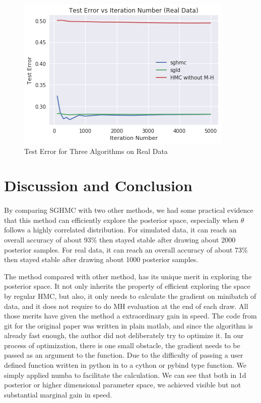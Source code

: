 \documentclass[11pt]{article}
\begin{document}
\begin{figure}[h!]
\centering
\caption{Test Error for Three Algorithms on Real Data}
\label{fig:Figure2}
\includegraphics[scale=0.5]{real.png}
\end{figure}




\section{Discussion and Conclusion}
\paragraph{}
By comparing SGHMC with two other methods, we had some practical evidence that this method can efficiently explore the posterior space, especially when $\theta$ follows a highly correlated distribution. For simulated data, it can reach an overall accuracy of about 93$\%$ then stayed stable after drawing about 2000 posterior samples. For real data, it can reach an overall accuracy of about 73$\%$ then stayed stable after drawing about 1000 posterior samples. 


The method compared with other method, has its unique merit in exploring the posterior space. It not only inherits the property of efficient exploring the space by regular HMC, but also, it only needs to calculate the gradient on minibatch of data, and it does not require to do MH evaluation at the end of each draw. All those merits have given the method a extraordinary gain in speed. The code from git for the original paper was written in plain matlab, and since the algorithm is already fast enough, the author did not deliberately try to optimize it.
In our process of optimization, there is one small obstacle, the gradient needs to be passed as an argument to the function.
Due to the difficulty of passing a user defined function written in python in to a cython or pybind type function. We simply applied numba to facilitate the calculation. We can see that both in 1d posterior or higher dimensional parameter space, we achieved visible but not substantial marginal gain in speed.   
\end{document}
